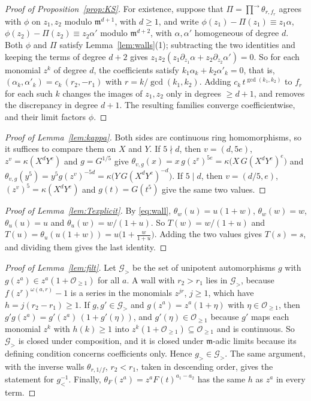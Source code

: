 \documentclass[11pt]{article}
\theoremstyle{definition}
\theoremstyle{remark}
\numberwithin{equation}{section}
\newcommand{\m}{\mathfrak{m}}
\newcommand{\Oge}[1]{\mathcal{O}_{\geq #1}}
\newcommand{\asc}{\textstyle\prod^{\rightarrow}}
\newcommand{\gl}{g_{<}}
\newcommand{\gr}{g_{>}}
\begin{document}
\begin{appendices}
\begin{proof}[Proof of Proposition~\ref{prop:KS}]
For existence, suppose that $\Pi=\asc\theta_{r,f_r}$ agrees with $\phi$
on $z_1,z_2$ modulo $\m^{d+1}$, with $d\geq1$, and write
$\phi(z_1)-\Pi(z_1)\equiv z_1\alpha$, $\phi(z_2)-\Pi(z_2)\equiv z_2\alpha'$
modulo $\m^{d+2}$, with $\alpha,\alpha'$ homogeneous of degree $d$. Both
$\phi$ and $\Pi$ satisfy Lemma~\ref{lem:walls}(1); subtracting the two
identities and keeping the terms of degree $d+2$ gives
$z_1z_2(z_1\partial_{z_1}\alpha+z_2\partial_{z_2}\alpha')=0$. So for
each monomial $z^k$ of degree $d$, the coefficients satisfy
$k_1\alpha_k+k_2\alpha'_k=0$, that is,
$(\alpha_k,\alpha'_k)=c_k\,(r_2,-r_1)$ with $r=k/\gcd(k_1,k_2)$. Adding
$c_k\,t^{\gcd(k_1,k_2)}$ to $f_r$ for each such $k$ changes the images of
$z_1,z_2$ only in degrees $\geq d+1$, and removes the discrepancy in
degree $d+1$. The resulting families converge coefficientwise, and their
limit factors $\phi$.
\end{proof}
\begin{proof}[Proof of Lemma~\ref{lem:kappa}]
Both sides are continuous ring homomorphisms, so it suffices to compare
them on $X$ and $Y$. If $5\nmid d$, then $v=(d,5e)$,
$z^{v}=\kappa(X^dY^e)$ and $g=G^{1/5}$ give
$\theta_{v,g}(x)=x\,g(z^v)^{5e}=\kappa\big(X\,G(X^dY^e)^e\big)$ and
$\theta_{v,g}(y^5)=y^5g(z^v)^{-5d}=\kappa\big(Y\,G(X^dY^e)^{-d}\big)$. If
$5\mid d$, then $v=(d/5,e)$, $(z^v)^5=\kappa(X^dY^e)$ and $g(t)=G(t^5)$
give the same two values.
\end{proof}

\begin{proof}[Proof of Lemma~\ref{lem:Texplicit}]
By \eqref{eq:wall}, $\theta_w(u)=u(1+w)$, $\theta_w(w)=w$,
$\theta_u(u)=u$ and $\theta_u(w)=w/(1+u)$. So $T(w)=w/(1+u)$ and
$T(u)=\theta_u(u(1+w))=u\big(1+\tfrac{w}{1+u}\big)$. Adding the two
values gives $T(s)=s$, and dividing them gives the last identity.
\end{proof}

\begin{proof}[Proof of Lemma~\ref{lem:filt}]
Let $\mathcal{G}_>$ be the set of unipotent automorphisms $g$ with
$g(z^a)\in z^a(1+\Oge1)$ for all $a$. A wall with $r_2>r_1$ lies in
$\mathcal{G}_>$, because $f(z^r)^{\omega(a,r)}-1$ is a series in the
monomials $z^{jr}$, $j\geq1$, which have $h=j(r_2-r_1)\geq1$. If
$g,g'\in\mathcal{G}_>$ and $g(z^a)=z^a(1+\eta)$ with $\eta\in\Oge1$, then
$g'g(z^a)=g'(z^a)\,(1+g'(\eta))$, and $g'(\eta)\in\Oge1$ because $g'$ maps each
monomial $z^k$ with $h(k)\geq1$ into $z^k(1+\Oge1)\subseteq\Oge1$ and is
continuous. So $\mathcal{G}_>$ is closed under composition, and it is
closed under $\m$-adic limits because its defining condition concerns
coefficients only. Hence $\gr\in\mathcal{G}_>$. The same argument, with
the inverse walls $\theta_{r,1/f}$, $r_2<r_1$, taken in descending order,
gives the statement for $\gl^{-1}$. Finally,
$\theta_F(z^a)=z^aF(t)^{a_1-a_2}$ has the same $h$ as $z^a$ in every
term.
\end{proof}


\end{appendices}
\end{document}
